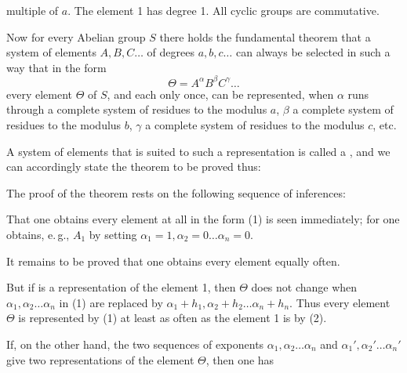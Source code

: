 multiple of $a$. The element 1 has degree 1. All cyclic groups are commutative.

Now for every Abelian group $S$ there holds the fundamental theorem that a system of elements $A, B, C \ldots$ of degrees $a, b, c \ldots$ can always be selected in such a way that in the form
\[
\Theta = A^\alpha B^\beta C^\gamma \ldots
\]
every element $\Theta$ of $S$, and each only once, can be represented, when $\alpha$ runs through a complete system of residues to the modulus $a$, $\beta$ a complete system of residues to the modulus $b$, $\gamma$ a complete system of residues to the modulus $c$, etc.

A system of elements that is suited to such a representation is called a , and we can accordingly state the theorem to be proved thus:


The proof of the theorem rests on the following sequence of inferences:


That one obtains every element at all in the form (1) is seen immediately; for one obtains, e.\,g., $A_1$ by setting $\alpha_1 = 1, \alpha_2 = 0 \ldots \alpha_n = 0$.

It remains to be proved that one obtains every element equally often.

But if
is a representation of the element 1, then $\Theta$ does not change when $\alpha_1, \alpha_2 \ldots \alpha_n$ in (1) are replaced by $\alpha_1 + h_1, \alpha_2 + h_2 \ldots \alpha_n + h_n$. Thus every element $\Theta$ is represented by (1) at least as often as the element 1 is by (2).

If, on the other hand, the two sequences of exponents $\alpha_1, \alpha_2 \ldots \alpha_n$ and $\alpha_1', \alpha_2' \ldots \alpha_n'$ give two representations of the element $\Theta$, then one has
